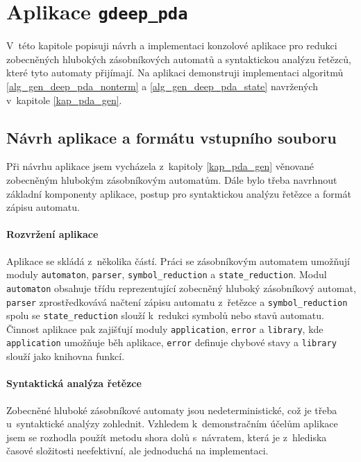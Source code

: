 
\chapter{Aplikace \texttt{gdeep\_pda}} \label{kap_aplikace}

V~této kapitole popisuji návrh a implementaci konzolové aplikace pro redukci zobecněných hlubokých zásobníkových automatů a syntaktickou analýzu řetězců, které tyto automaty přijímají. Na aplikaci demonstruji implementaci algoritmů \ref{alg_gen_deep_pda_nonterm} a \ref{alg_gen_deep_pda_state} navržených v~kapitole \ref{kap_pda_gen}.


\section{Návrh aplikace a formátu vstupního souboru}

Při návrhu aplikace jsem vycházela z~kapitoly \ref{kap_pda_gen} věnované zobecněným hlubokým zásobníkovým automatům. Dále bylo třeba navrhnout základní komponenty aplikace, postup pro syntaktickou analýzu řetězce a formát zápisu automatu. 

\subsubsection{Rozvržení aplikace}\label{kap_aplikace_rozvrzeni}

Aplikace se skládá z~několika částí. Práci se zásobníkovým automatem umožňují moduly \texttt{automaton}, \texttt{parser}, \texttt{symbol\_reduction} a \texttt{state\_reduction}. 
Modul \texttt{automaton} obsahuje třídu reprezentující zobecněný hluboký zásobníkový automat, \texttt{parser} zprostředkovává načtení zápisu automatu z~řetězce a \texttt{symbol\_reduction} spolu se \texttt{state\_reduction} slouží k~redukci symbolů nebo stavů automatu.
Činnost aplikace pak zajišťují moduly \texttt{application}, \texttt{error} a \texttt{library}, kde \texttt{application} umožňuje běh aplikace, \texttt{error} definuje chybové stavy a \texttt{library} slouží jako knihovna funkcí.

\subsubsection{Syntaktická analýza řetězce}\label{kap_aplikace_analyza}

Zobecněné hluboké zásobníkové automaty jsou nedeterministické, což je třeba u~syntaktické analýzy zohlednit. Vzhledem k~demonstračním účelům aplikace jsem se rozhodla použít metodu shora dolů s~návratem, která je z~hlediska časové složitosti neefektivní, ale jednoduchá na implementaci.

